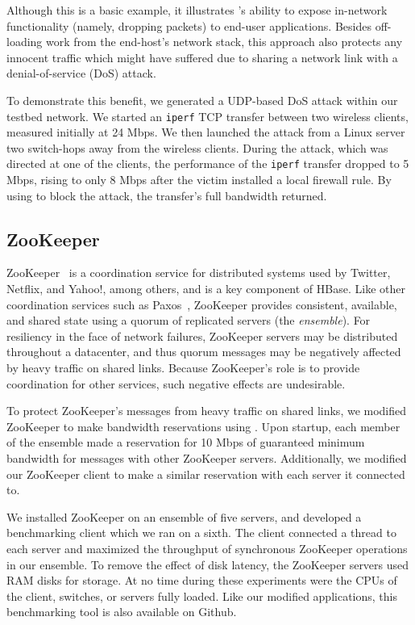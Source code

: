 Although this is a basic example, it illustrates \sys's ability to
expose in-network functionality (namely, dropping packets) to
end-user applications.  Besides off-loading work from the end-host's
network stack, this approach also protects any innocent traffic
which might have suffered due to sharing a network link with a
denial-of-service (DoS) attack.

To demonstrate this benefit, we generated a UDP-based DoS attack
within our testbed network. We started an \verb/iperf/ TCP transfer between
two wireless clients, measured initially at 24 Mbps. We then
launched the attack from a Linux server two switch-hops away from
the wireless clients. During the attack, which was directed at one
of the clients, the performance of the \verb/iperf/ transfer dropped to 5
Mbps, rising to only 8 Mbps after the victim installed a local
firewall rule.  By using \sys to block the attack, the transfer's
full bandwidth returned.

\subsection{ZooKeeper}

ZooKeeper~\cite{Hunt:2010} is a coordination service for distributed systems 
used by Twitter, Netflix, and Yahoo!, among others, and is a key component of 
HBase. Like other coordination services such as Paxos~\cite{Lamport:1998}, 
ZooKeeper provides consistent, available, and shared state using a quorum of 
replicated servers (the \emph{ensemble}). For resiliency in the face of network 
failures, ZooKeeper servers may be distributed throughout a datacenter, and 
thus quorum messages may be negatively affected by heavy traffic on shared 
links. Because ZooKeeper's role is to provide coordination for other services, 
such negative effects are undesirable.

To protect ZooKeeper's messages from heavy traffic on shared links, we modified 
ZooKeeper to make bandwidth reservations using \sys. Upon startup, each member 
of the ensemble made a reservation for 10 Mbps of guaranteed minimum bandwidth for 
messages with other ZooKeeper servers. Additionally, we modified our ZooKeeper 
client to make a similar reservation with each server it connected to.

We installed ZooKeeper on an ensemble of five servers, and developed a 
benchmarking client which we ran on a sixth. The client connected a thread to 
each server and maximized the throughput of synchronous ZooKeeper operations in 
our ensemble.
To remove the effect of disk latency, the ZooKeeper servers used
RAM disks for storage.
At no time during these experiments were the CPUs of the client, 
switches, or servers fully loaded.
Like our modified applications, this benchmarking tool is also available on Github.

